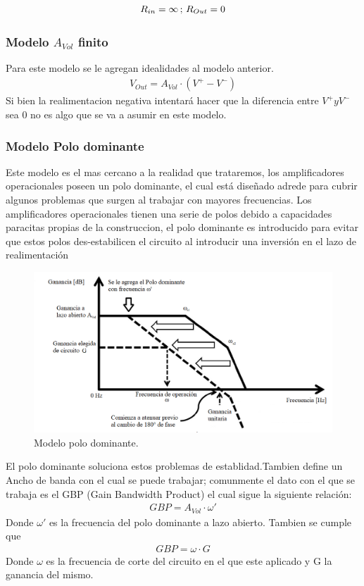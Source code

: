 \begin{align} R_{in}=\infty   \thinspace;\thinspace R_{Out} = 0 \end{align}
\subsubsection{Modelo $A_{Vol}$ finito}
Para este modelo se le agregan idealidades al modelo anterior.
\begin{align}V_{Out} = A_{Vol} \cdot (V^+ - V^-)\end{align}
Si bien la realimentacion negativa intentará hacer que la diferencia entre $V^+ y V^-$ sea 0 no es algo que se va a asumir en este modelo.
\subsubsection{Modelo Polo dominante}
Este modelo es el mas cercano a la realidad que trataremos, los amplificadores operacionales poseen un polo dominante, el cual está diseñado adrede para cubrir algunos problemas que surgen
al trabajar con mayores frecuencias. Los amplificadores operacionales tienen una serie de polos debido a capacidades paracitas propias de la construccion, el  polo dominante es introducido para evitar que estos polos des-estabilicen el circuito al introducir una inversión en el lazo de realimentación 
\begin{figure}[H]	
	\centering
	\includegraphics[width=\textwidth]{Ejercicio1/Imagenes/dompole.png}
	\caption{Modelo polo dominante.}
	\label{fig:dompole}
\end{figure}
El polo dominante soluciona estos problemas de establidad.Tambien define un Ancho de banda con el cual se puede trabajar; comunmente el dato con el que se trabaja es el GBP (Gain Bandwidth Product) el cual sigue la siguiente relación:
\begin{align} GBP= A_{Vol} \cdot \omega' \end{align}
Donde $\omega'$ es la frecuencia del polo dominante a lazo abierto.
Tambien se cumple que 
\begin{align} GBP=\omega \cdot G \end{align}
Donde $\omega$ es la frecuencia de corte del circuito en el que este aplicado y G la ganancia del mismo.


